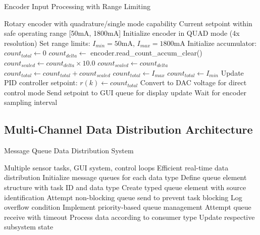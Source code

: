 \documentclass{article}
\begin{document}
\begin{algorithm}
\caption{Encoder Input Processing with Range Limiting}
\label{alg:encoder_processing}
\begin{algorithmic}[1]
\REQUIRE Rotary encoder with quadrature/single mode capability
\ENSURE Current setpoint within safe operating range [50mA, 1800mA]
\STATE Initialize encoder in QUAD mode (4x resolution)
\STATE Set range limits: $I_{min} = 50$mA, $I_{max} = 1800$mA
\STATE Initialize accumulator: $count_{total} \leftarrow 0$
    \STATE $count_{delta} \leftarrow$ encoder.read\_count\_accum\_clear()
    \STATE {}
        \STATE $count_{scaled} \leftarrow count_{delta} \times 10.0$ 
    \ELSE {}
        \STATE $count_{scaled} \leftarrow count_{delta}$ 
    \ENDIF
    \STATE $count_{total} \leftarrow count_{total} + count_{scaled}$
    \STATE {}
        \STATE $count_{total} \leftarrow I_{max}$
        \STATE $count_{total} \leftarrow I_{min}$
    \ENDIF
    \STATE {}
        \STATE Update PID controller setpoint: $r(k) \leftarrow count_{total}$
        \STATE Convert to DAC voltage for direct control mode
        \STATE Send setpoint to GUI queue for display update
    \ENDIF
    \STATE Wait for encoder sampling interval
\ENDWHILE
\end{algorithmic}
\end{algorithm}

\subsection{Multi-Channel Data Distribution Architecture}

\begin{algorithm}
\caption{Message Queue Data Distribution System}
\label{alg:data_distribution}
\begin{algorithmic}[1]
\REQUIRE Multiple sensor tasks, GUI system, control loops
\ENSURE Efficient real-time data distribution
\STATE Initialize message queues for each data type
\STATE Define queue element structure with task ID and data type
    \STATE {}
        \STATE Create typed queue element with source identification
        \STATE Attempt non-blocking queue send to prevent task blocking
            \STATE Log overflow condition
            \STATE Implement priority-based queue management
        \ENDIF
    \ENDFOR
    \STATE {}
        \STATE Attempt queue receive with timeout
        \STATE Process data according to consumer type
        \STATE Update respective subsystem state
    \ENDFOR
\ENDWHILE
\end{algorithmic}
\end{algorithm}
\end{document}
